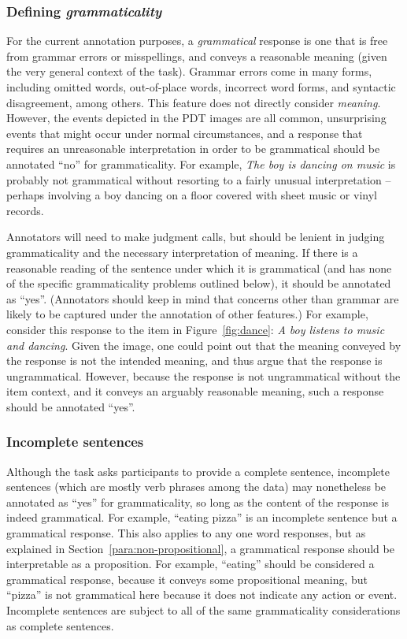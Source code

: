 \documentclass[12pt,notitlepage]{article}
\begin{document}
\subsubsection{Defining \textit{grammaticality}} For the current annotation purposes, a \textit{grammatical} response is one that is free from grammar errors or misspellings, and conveys a reasonable meaning (given the very general context of the task). Grammar errors come in many forms, including omitted words, out-of-place words, incorrect word forms, and syntactic disagreement, among others. This feature does not directly consider \textit{meaning}. However, the events depicted in the PDT images are all common, unsurprising events that might occur under normal circumstances, and a response that requires an unreasonable interpretation in order to be grammatical should be annotated ``no'' for grammaticality. For example, \textit{The boy is dancing on music} is probably not grammatical without resorting to a fairly unusual interpretation -- perhaps involving a boy dancing on a floor covered with sheet music or vinyl records.

Annotators will need to make judgment calls, but should be lenient in judging grammaticality and the necessary interpretation of meaning. If there is a reasonable reading of the sentence under which it is grammatical (and has none of the specific grammaticality problems outlined below), it should be annotated as ``yes''. (Annotators should keep in mind that concerns other than grammar are likely to be captured under the annotation of other features.) For example, consider this response to the item in Figure~\ref{fig:dance}: \textit{A boy listens to music and dancing}. Given the image, one could point out that the meaning conveyed by the response is not the intended meaning, and thus argue that the response is ungrammatical. However, because the response is not ungrammatical without the item context, and it conveys an arguably reasonable meaning, such a response should be annotated ``yes''.

\subsubsection{Incomplete sentences} \label{subsubsec:gram-incomplete-sentences} Although the task asks participants to provide a complete sentence, incomplete sentences (which are mostly verb phrases among the data) may nonetheless be annotated as ``yes'' for grammaticality, so long as the content of the response is indeed grammatical. For example, ``eating pizza'' is an incomplete sentence but a grammatical response. This also applies to any one word responses, but as explained in Section~\ref{para:non-propositional}, a grammatical response should be interpretable as a proposition. For example, ``eating'' should be considered a grammatical response, because it conveys some propositional meaning, but ``pizza'' is not grammatical here because it does not indicate any action or event. Incomplete sentences are subject to all of the same grammaticality considerations as complete sentences.
\end{document}
